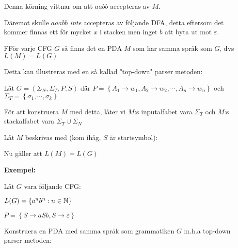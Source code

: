 \par\bigskip
\noindent Denna körning vittnar om att $aabb$ accepteras av $M$.\par
\noindent Däremot skulle $aaabb$ \textit{inte} accepteras av följande DFA, detta eftersom det kommer finnas ett för mycket $x$ i stacken men inget $b$ att byta ut mot $\varepsilon$.
\par\bigskip
\begin{theo}
  FFör varje CFG $G$ så finns det en PDA $M$ som har samma språk som $G$, dvs $L(M) = L(G)$
\end{theo}
\par\bigskip
\noindent Detta kan illustreras med en så kallad "top-down" parser metoden:\par
\noindent Låt $G = (\Sigma_N,\Sigma_T,P,S)$ där $P = \left\{A_1\to w_1, A_2\to w_2,\cdots, A_n\to w_n\right\}$ och $\Sigma_T = \left\{\sigma_1,\cdots, \sigma_k\right\}$
\par\bigskip
\noindent För att konstruera $M$ med detta, låter vi $M$:s inputalfabet vara $\Sigma_T$ och $M$:s stackalfabet vara $\Sigma_T\cup\Sigma_N$\par
\noindent Låt $M$ beskrivas med (kom ihåg, $S$ är startsymbol):
\begin{figure}[ht!]
    \centering
    \caption{}
\end{figure}
\par\bigskip
\noindent Nu gäller att $L(M) = L(G)$
\par\bigskip
\noindent\textbf{Exempel:}\par
\noindent Låt $G$ vara följande CFG:\par
$L(G) = \left\{a^nb^n:n\in\mathbb{N}\right\}$\par
$P = \left\{S\to aSb, S\to\varepsilon\right\}$\par
\noindent Konstruera en PDA med samma språk som grammatiken $G$ m.h.a top-down parser metoden:
